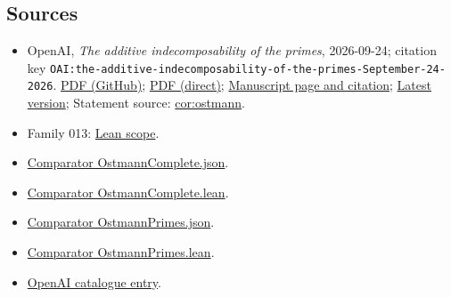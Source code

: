 \documentclass[11pt]{article}
\begin{document}
\subsection{Sources}
\begin{itemize}
\item OpenAI, \emph{The additive indecomposability of the primes}, 2026-09-24; citation key \texttt{OAI:the-additive-indecomposability-of-the-primes-September-24-2026}. \href{https://github.com/openai/math/blob/adc7f1241b42e322a6451854ab7e4b4c146bf78a/preprints/the-additive-indecomposability-of-the-primes-September-24-2026/paper.pdf}{PDF (GitHub)}; \href{https://github.com/openai/math/raw/adc7f1241b42e322a6451854ab7e4b4c146bf78a/preprints/the-additive-indecomposability-of-the-primes-September-24-2026/paper.pdf}{PDF (direct)}; \href{https://github.com/openai/math/blob/adc7f1241b42e322a6451854ab7e4b4c146bf78a/preprints/the-additive-indecomposability-of-the-primes-September-24-2026/README.md}{Manuscript page and citation}; \href{https://github.com/openai/math/blob/main/preprints/the-additive-indecomposability-of-the-primes-September-24-2026/paper.pdf}{Latest version}; Statement source: \href{https://github.com/openai/math/blob/adc7f1241b42e322a6451854ab7e4b4c146bf78a/preprints/the-additive-indecomposability-of-the-primes-September-24-2026/build/sections/01-introduction.tex\#L15}{cor:ostmann}.
\item Family 013: \href{https://github.com/openai/math/blob/adc7f1241b42e322a6451854ab7e4b4c146bf78a/lean/docs/013.md}{Lean scope}.
\item \href{https://github.com/openai/math/blob/adc7f1241b42e322a6451854ab7e4b4c146bf78a/lean/ComparatorChallenges/OstmannComplete.json}{Comparator OstmannComplete.json}.
\item \href{https://github.com/openai/math/blob/adc7f1241b42e322a6451854ab7e4b4c146bf78a/lean/ComparatorChallenges/OstmannComplete.lean}{Comparator OstmannComplete.lean}.
\item \href{https://github.com/openai/math/blob/adc7f1241b42e322a6451854ab7e4b4c146bf78a/lean/ComparatorChallenges/OstmannPrimes.json}{Comparator OstmannPrimes.json}.
\item \href{https://github.com/openai/math/blob/adc7f1241b42e322a6451854ab7e4b4c146bf78a/lean/ComparatorChallenges/OstmannPrimes.lean}{Comparator OstmannPrimes.lean}.
\item \href{https://github.com/openai/math/blob/adc7f1241b42e322a6451854ab7e4b4c146bf78a/CONTENTS.md}{OpenAI catalogue entry}.
\end{itemize}
\end{document}
